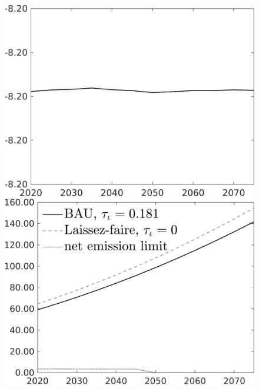 \documentclass[12pt]{article}
\begin{document}
\begin{figure}[h!!]
\begin{minipage}[]{0.32\textwidth}
	\end{minipage}	
	\begin{minipage}[]{0.32\textwidth}
		\includegraphics[width=1\textwidth]{../../codding_model/own_basedOnFried/optimalPol_010922_revision/figures/all_13Sept22/CompTaul_LFBAUPer_Reg0_C_spillover0_nsk1_xgr1_knspil1_sep1_countec0_GovRev0_etaa0.79.png}
	\end{minipage}	
	\begin{minipage}[]{0.32\textwidth}
		\includegraphics[width=1\textwidth]{../../codding_model/own_basedOnFried/optimalPol_010922_revision/figures/all_13Sept22/CompTaul_LFBAU_Reg0_Emnet_spillover0_nsk1_xgr1_knspil1_sep1_countec0_GovRev0_etaa0.79_lgd1.png}

\end{minipage}
\end{figure}
\end{document}
